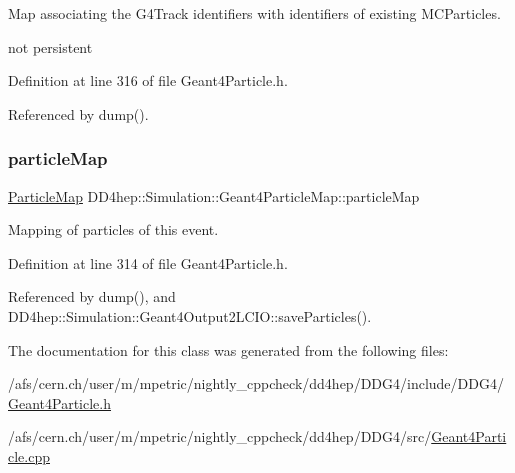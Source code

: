 Map associating the G4\+Track identifiers with identifiers of existing M\+C\+Particles. 

not persistent 

Definition at line 316 of file Geant4\+Particle.\+h.



Referenced by dump().

\hypertarget{class_d_d4hep_1_1_simulation_1_1_geant4_particle_map_ac5be2ea78909ee55da8e4008c4f727a0}{}\label{class_d_d4hep_1_1_simulation_1_1_geant4_particle_map_ac5be2ea78909ee55da8e4008c4f727a0} 
\subsubsection{\texorpdfstring{particle\+Map}{particleMap}}
{\footnotesize\ttfamily \hyperlink{class_d_d4hep_1_1_simulation_1_1_geant4_particle_map_a065c5fb0629285022b9aa2a628bffef3}{Particle\+Map} D\+D4hep\+::\+Simulation\+::\+Geant4\+Particle\+Map\+::particle\+Map}



Mapping of particles of this event. 



Definition at line 314 of file Geant4\+Particle.\+h.



Referenced by dump(), and D\+D4hep\+::\+Simulation\+::\+Geant4\+Output2\+L\+C\+I\+O\+::save\+Particles().



The documentation for this class was generated from the following files\+:\begin{DoxyCompactItemize}
\item 
/afs/cern.\+ch/user/m/mpetric/nightly\+\_\+cppcheck/dd4hep/\+D\+D\+G4/include/\+D\+D\+G4/\hyperlink{_geant4_particle_8h}{Geant4\+Particle.\+h}\item 
/afs/cern.\+ch/user/m/mpetric/nightly\+\_\+cppcheck/dd4hep/\+D\+D\+G4/src/\hyperlink{_geant4_particle_8cpp}{Geant4\+Particle.\+cpp}\end{DoxyCompactItemize}
